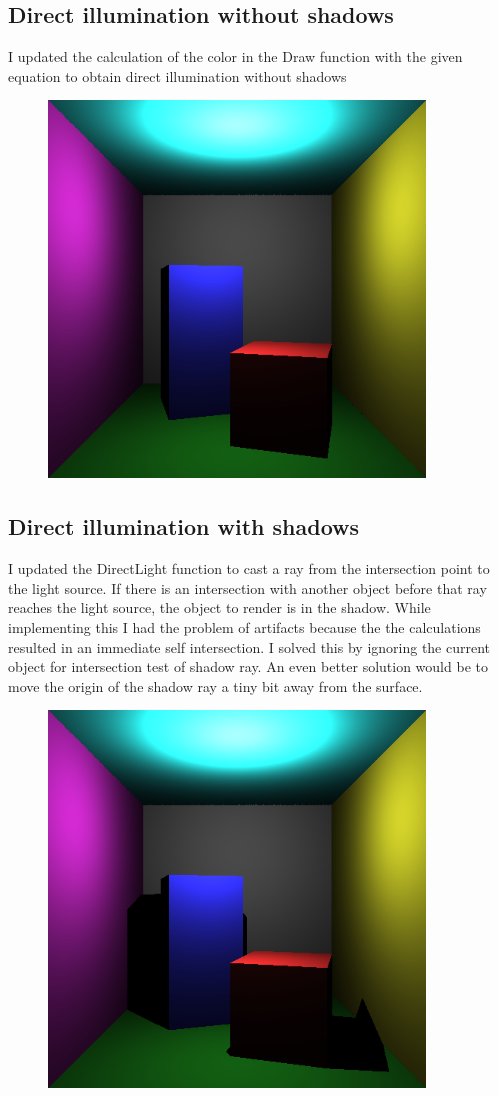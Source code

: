 \subsection{Direct illumination without shadows}
I updated the calculation of the color in the Draw function with the given equation to obtain direct illumination without shadows
\begin{figure}[ht]
    \centering
    \includegraphics[width=10cm]{screenshots/direct_without_shadows.png}
\end{figure}
\clearpage
\subsection{Direct illumination with shadows}
I updated the DirectLight function to cast a ray from the intersection point to the light source. If there is an intersection with another object 
before that ray reaches the light source, the object to render is in the shadow. While implementing this I had the problem of artifacts because the
the calculations resulted in an immediate self intersection. I solved this by ignoring the current object for intersection test of shadow ray. 
An even better solution would be to move the origin of the shadow ray a tiny bit away from the surface.
\begin{figure}[ht]
    \centering
    \includegraphics[width=10cm]{screenshots/direct_with_shadows.png}
\end{figure}
\clearpage
